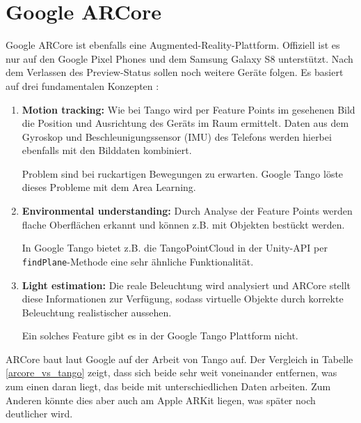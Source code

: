 
\section{Google ARCore}
Google ARCore ist ebenfalls eine Augmented-Reality-Plattform. Offiziell ist es nur auf den Google Pixel Phones und dem Samsung Galaxy S8 unterstützt. Nach dem Verlassen des Preview-Status sollen noch weitere Geräte folgen. Es basiert auf drei fundamentalen Konzepten \cite{arcore_overview}:
\begin{enumerate}
	\item \textbf{Motion tracking:} Wie bei Tango wird per Feature Points im gesehenen Bild die Position und Ausrichtung des Geräts im Raum ermittelt. Daten aus dem Gyroskop und Beschleunigungssensor (IMU) des Telefons werden hierbei ebenfalls mit den Bilddaten kombiniert. \cite{arcore_fundamentals}\par
	Problem sind bei ruckartigen Bewegungen zu erwarten. Google Tango löste dieses Probleme mit dem Area Learning.
	\item \textbf{Environmental understanding:}  Durch Analyse der Feature Points werden flache Oberflächen erkannt und können z.B. mit Objekten bestückt werden. \cite{arcore_fundamentals}\par
	In Google Tango bietet z.B. die TangoPointCloud in der Unity-API per \texttt{findPlane}-Methode eine sehr ähnliche Funktionalität.
	\item \textbf{Light estimation:} Die reale Beleuchtung wird analysiert und ARCore stellt diese Informationen zur Verfügung, sodass virtuelle Objekte durch korrekte Beleuchtung realistischer aussehen. \cite{arcore_fundamentals}\par
	Ein solches Feature gibt es in der Google Tango Plattform nicht.\\
\end{enumerate}

ARCore baut laut Google auf der Arbeit von Tango auf. Der Vergleich in Tabelle \ref{arcore_vs_tango} zeigt, dass sich beide sehr weit voneinander entfernen, was zum einen daran liegt, das beide mit unterschiedlichen Daten arbeiten. Zum Anderen könnte dies aber auch am Apple ARKit liegen, was später noch deutlicher wird.

